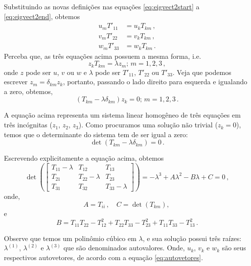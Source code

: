 Substituindo as novas defini\c{c}\~oes nas equa\c{c}\~oes 
\ref{eq:eigvect2start} a \ref{eq:eigvect2end},
obtemos
\begin{align}
  u_{m}T'_{11}  &=  u_{k}T_{km}\, , \\
  v_{m}T'_{22}  &=  v_{k}T_{km} \, ,\\
  w_{m}T'_{33}  &=  w_{k}T_{km} \,.
\end{align}
Perceba que, as tr\^es equa\c{c}\~oes acima possuem a mesma forma, i.e.
\begin{equation}
  z_{k}T_{km} = \lambda z_{m};\, m=1,2,3 \, ,
  \label{eq:autovetores}
\end{equation}
onde $z$ pode ser $u$, $v$ ou $w$ e $\lambda$ pode ser $T'_{11}$, $T'_{22}$ ou $T'_{33}$.
Veja que podemos escrever $z_m=\delta_{km}z_k$, portanto, passando o lado direito para
esquerda e igualando a zero, obtemos,
\begin{equation}
  (T_{km}-\lambda\delta_{km})z_k=0;\, m=1,2,3\, .
\end{equation}

A equa\c{c}\~ao acima representa um sistema linear homog\^eneo de tr\^es
equa\c{c}\~oes em tr\^es inc\'ognitas ($z_{1}$, $z_{2}$, $z_{3}$). Como
procuramos uma solu\c{c}\~ao n\~ao trivial ($z_{k}=0$), temos que o determinante
do sistema tem de ser igual a zero:
\begin{equation}
  \det(T_{km}-\lambda\delta_{km}) = 0 \, .
\end{equation}

Escrevendo explicitamente a equa\c{c}\~ao acima, obtemos
\begin{equation}
  \det\left(
  \begin{bmatrix}
    T_{11}-\lambda & T_{12} & T_{13} \\
    T_{21} & T_{22}-\lambda & T_{23} \\
    T_{31} & T_{32} & T_{33} -\lambda
  \end{bmatrix}\right)
  = -\lambda^3 + A\lambda^2-B\lambda+C = 0
  \, ,
\end{equation}
onde,
\begin{equation}
  A =T_{ii}\, , \quad C=\det(T_{km}), \,
\end{equation}
e
\begin{equation}
  B = T_{11}T_{22} - T^2_{12} + T_{22}T_{33} -T^2_{23} + T_{11}T_{33} -
  T^2_{13}\, .
\end{equation}

Observe que temos um polin\^omio c\'ubico em $\lambda$, e sua solu\c{c}\~ao
possui tr\^es ra\'izes: $\lambda^{(1)}$, $\lambda^{(2)}$ e $\lambda^{(3)}$ que
s\~ao denominados autovalores. Onde, $u_k$, $v_k$ e $w_k$ s\~ao seus respectivos
autovetores, de acordo com a equa\c{c}\~ao \ref{eq:autovetores}.

